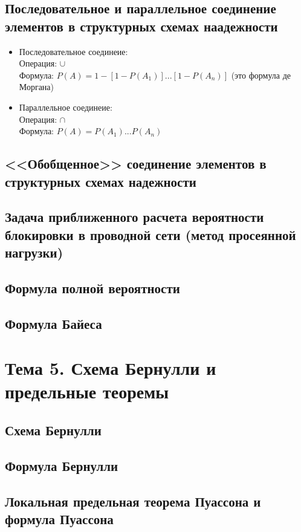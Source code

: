 \documentclass[12pt]{article}
\begin{document}
\subsection{Последовательное и параллельное соединение элементов в структурных схемах наадежности}
\begin{itemize}
	\item Последовательное соединеие: \\
	      Операция: $\cup$ \\
	      Формула: $P(A) = 1 - [1 - P(A_1)]...[1 - P(A_n)]$ (это формула де Моргана)
	\item Параллельное соединеие: \\
	      Операция: $\cap$ \\
	      Формула: $P(A) = P(A_1)...P(A_n)$
\end{itemize}

\subsection{<<Обобщенное>> соединение элементов в структурных схемах надежности}
\subsection{Задача приближенного расчета вероятности блокировки в проводной сети (метод просеянной нагрузки)}
\subsection{Формула полной вероятности}
\subsection{Формула Байеса}

\section{Тема 5. Схема Бернулли и предельные теоремы}
\subsection{Схема Бернулли}
\subsection{Формула Бернулли}
\subsection{Локальная предельная теорема Пуассона и формула Пуассона}
\end{document}

